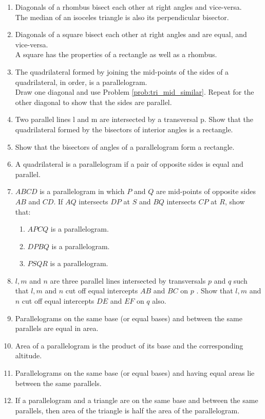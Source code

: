 \begin{enumerate}[label=\arabic*.,ref=\thesubsection.\theenumi]
%
\item  Diagonals of a rhombus bisect each other at right angles and vice-versa. 
%
\\
\solution The median of an isoceles triangle is also its perpendicular bisector.
%
\item  Diagonals of a square bisect each other at right angles and are equal, and vice-versa. 
%
\\
\solution A square has the properties of a rectangle as well as a rhombus.
%
%
\item  The quadrilateral formed by joining the mid-points of the sides of a quadrilateral, in order, is a parallelogram.
%
\\
\solution Draw one diagonal and use Problem \ref{prob:tri_mid_similar}.  Repeat for the other diagonal to show that the sides are parallel.
%
\item Two parallel lines l and m are intersected by a transversal p. Show that the quadrilateral formed by the bisectors of interior angles is a rectangle.
%
\item Show that the bisectors of angles of a parallelogram form a rectangle.
%
\item A quadrilateral is a parallelogram if a pair of opposite sides is equal and parallel.
%
\item $ABCD$ is a parallelogram in which $P$ and $Q$ are mid-points of opposite sides $AB$ and $CD$. If $AQ$ intersects $DP$ at $S$ and $BQ$ intersects $CP$ at $R$, show that: 
%
\begin{enumerate}
\item  $APCQ$ is a parallelogram. 
\item $DPBQ$ is a parallelogram. 
\item $PSQR$ is a parallelogram.
\end{enumerate}
%
\item $l, m$ and $n$ are three parallel lines intersected by transversals $p$ and $q$ such that $l, m$ and $n$ cut off equal intercepts $AB$ and $BC$ on $p$ . Show that $l, m$ and $n$ cut off equal intercepts $DE$ and $EF$ on $q$ also.
%
\item Parallelograms on the same base (or equal bases) and between the same parallels are equal in area.
\item Area of a parallelogram is the product of its base and the corresponding altitude. 
\item Parallelograms on the same base (or equal bases) and having equal areas lie between the same parallels.
\item If a parallelogram and a triangle are on the same base and between the same parallels, then area of the triangle is half the area of the parallelogram.

\end{enumerate}
